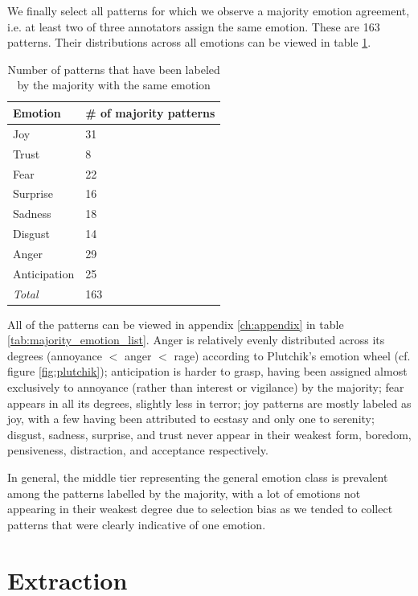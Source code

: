 We finally select all patterns for which we observe a majority emotion agreement, i.e. at least two of three annotators assign the same emotion. These are 163 patterns. Their distributions across all emotions can be viewed in table \ref{tab:pattern_emotion_distribution}.

\begin{table}[h]
\centering
\begin{tabular}{l|l}
{\bf Emotion} & {\bf \# of majority patterns} \\\hline
Joy           & 31\\
Trust         & 8\\
Fear          & 22\\
Surprise      & 16\\
Sadness       & 18\\
Disgust       & 14\\
Anger         & 29\\
Anticipation  & 25\\\hline
\textit{Total} & 163
\end{tabular}
\caption{Number of patterns that have been labeled by the majority with the same emotion}
\label{tab:pattern_emotion_distribution}
\end{table}

All of the patterns can be viewed in appendix \ref{ch:appendix} in table \ref{tab:majority_emotion_list}. Anger is relatively evenly distributed across its degrees (annoyance $<$ anger $<$ rage) according to Plutchik's emotion wheel (cf. figure \ref{fig:plutchik}); anticipation is harder to grasp, having been assigned almost exclusively to annoyance (rather than interest or vigilance) by the majority; fear appears in all its degrees, slightly less in terror; joy patterns are mostly labeled as joy, with a few having been attributed to ecstasy and only one to serenity; disgust, sadness, surprise, and trust never appear in their weakest form, boredom, pensiveness, distraction, and acceptance respectively.

In general, the middle tier representing the general emotion class is prevalent among the patterns labelled by the majority, with a lot of emotions not appearing in their weakest degree due to selection bias as we tended to collect patterns that were clearly indicative of one emotion.

\section{Extraction} \label{sec:extraction_section}

